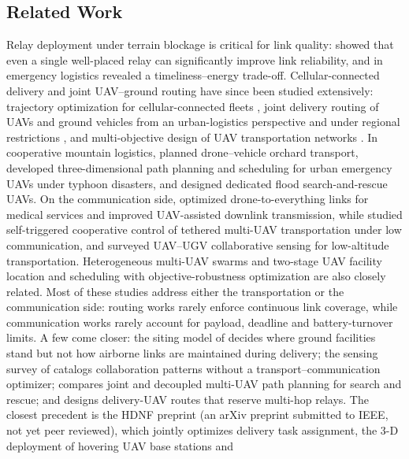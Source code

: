 \documentclass[journal]{IEEEtran}
\begin{document}
\subsection{Related Work}
Relay deployment under terrain blockage is critical for link quality:
\cite{cuu2026} showed that even a single well-placed relay can significantly
improve link reliability, and in emergency logistics \cite{wu2024} revealed a
timeliness--energy trade-off.
Cellular-connected delivery and joint UAV--ground routing have since been
studied extensively: trajectory optimization for cellular-connected fleets
\cite{cao2024}, joint delivery routing of UAVs and ground vehicles from an
urban-logistics perspective \cite{wuXu2026} and under regional restrictions
\cite{wu2026}, and multi-objective design of UAV transportation networks
\cite{xia2019}. In cooperative mountain logistics, \cite{sun2026} planned
drone--vehicle orchard transport, \cite{dong2026} developed three-dimensional
path planning and scheduling for urban emergency UAVs under typhoon disasters,
and \cite{wan2024} designed dedicated flood search-and-rescue UAVs. On the
communication side, \cite{sabuncu2024} optimized drone-to-everything links for
medical services and \cite{huang2024} improved UAV-assisted downlink
transmission, while \cite{zhang2021} studied self-triggered cooperative control
of tethered multi-UAV transportation under low communication, and \cite{li2026}
surveyed UAV--UGV collaborative sensing for low-altitude transportation.
Heterogeneous multi-UAV swarms \cite{ma2020} and two-stage UAV facility location
and scheduling with objective-robustness optimization \cite{guo2026} are also
closely related. Most of these studies address either the transportation or the
communication side: routing works rarely enforce continuous link coverage, while
communication works rarely account for payload, deadline and battery-turnover
limits. A few come closer: the siting model of \cite{guo2026} decides where
ground facilities stand but not how airborne links are maintained during
delivery; the sensing survey of \cite{li2026} catalogs collaboration patterns
without a transport--communication optimizer; \cite{yanmaz2023} compares joint
and decoupled multi-UAV path planning for search and rescue; and \cite{soya2025}
designs delivery-UAV routes that reserve multi-hop relays. The closest
precedent is the HDNF preprint \cite{huang2026hdnf} (an arXiv preprint
submitted to IEEE, not yet peer reviewed), which jointly optimizes delivery
task assignment, the 3-D deployment of hovering UAV base stations and
\end{document}
